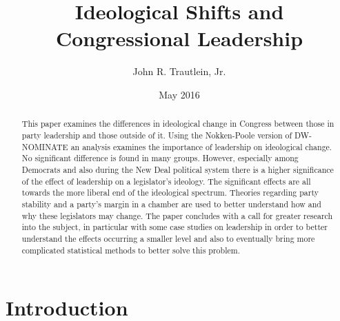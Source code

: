\documentclass[12pt,twoside]{reedthesis}
\title{Ideological Shifts and Congressional Leadership}
\author{John R. Trautlein, Jr.}
\date{May 2016}
\begin{document}
      \maketitle
  
  \frontmatter %
  \pagestyle{empty} %

  
  

      \hypersetup{linkcolor=black}
    \setcounter{tocdepth}{2}
    \tableofcontents
  
      \listoftables
  
      \listoffigures
  
      \begin{abstract}
      This paper examines the differences in ideological change in Congress
      between those in party leadership and those outside of it. Using the
      Nokken-Poole version of DW-NOMINATE an analysis examines the importance
      of leadership on ideological change. No significant difference is found
      in many groups. However, especially among Democrats and also during the
      New Deal political system there is a higher significance of the effect
      of leadership on a legislator's ideology. The significant effects are
      all towards the more liberal end of the ideological spectrum. Theories
      regarding party stability and a party's margin in a chamber are used to
      better understand how and why these legislators may change. The paper
      concludes with a call for greater research into the subject, in
      particular with some case studies on leadership in order to better
      understand the effects occurring a smaller level and also to eventually
      bring more complicated statistical methods to better solve this problem.
    \end{abstract}
  
  
  \mainmatter %
  \pagestyle{fancyplain} %

  \doublespacing
  
  \chapter*{Introduction}\label{introduction}
  
\end{document}
